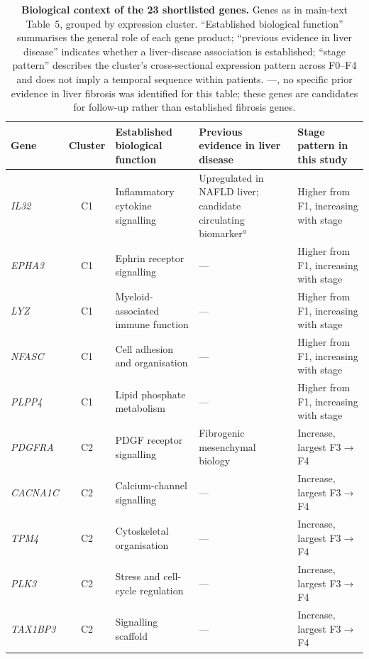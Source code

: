 \documentclass[10pt,a4paper]{article}
\newcommand{\tabsetup}{\sffamily\footnotesize\rowcolors{2}{zebra}{white}\renewcommand{\arraystretch}{1.25}\arrayrulecolor{rule}}
\begin{document}
\begin{table}[p]\centering
\caption{\textbf{Biological context of the 23 shortlisted genes.} Genes as in main-text Table~5, grouped by expression cluster. ``Established biological function'' summarises the general role of each gene product; ``previous evidence in liver disease'' indicates whether a liver-disease association is established; ``stage pattern'' describes the cluster's cross-sectional expression pattern across F0--F4 and does not imply a temporal sequence within patients. ---, no specific prior evidence in liver fibrosis was identified for this table; these genes are candidates for follow-up rather than established fibrosis genes.}
\label{tab:shortlistbio}
{\tabsetup
\begin{tabularx}{\linewidth}{@{}l c >{\raggedright\arraybackslash}X >{\raggedright\arraybackslash}X >{\raggedright\arraybackslash}p{3.6cm}@{}}
\toprule
\rowcolor{white}\textbf{Gene} & \textbf{Cluster} & \textbf{Established biological function} & \textbf{Previous evidence in liver disease} & \textbf{Stage pattern in this study} \\
\midrule
\textit{IL32} & C1 & Inflammatory cytokine signalling & Upregulated in NAFLD liver; candidate circulating biomarker$^{a}$ & Higher from F1, increasing with stage \\
\textit{EPHA3} & C1 & Ephrin receptor signalling & --- & Higher from F1, increasing with stage \\
\textit{LYZ} & C1 & Myeloid-associated immune function & --- & Higher from F1, increasing with stage \\
\textit{NFASC} & C1 & Cell adhesion and organisation & --- & Higher from F1, increasing with stage \\
\textit{PLPP4} & C1 & Lipid phosphate metabolism & --- & Higher from F1, increasing with stage \\
\textit{PDGFRA} & C2 & PDGF receptor signalling & Fibrogenic mesenchymal biology & Increase, largest F3$\rightarrow$F4 \\
\textit{CACNA1C} & C2 & Calcium-channel signalling & --- & Increase, largest F3$\rightarrow$F4 \\
\textit{TPM4} & C2 & Cytoskeletal organisation & --- & Increase, largest F3$\rightarrow$F4 \\
\textit{PLK3} & C2 & Stress and cell-cycle regulation & --- & Increase, largest F3$\rightarrow$F4 \\
\textit{TAX1BP3} & C2 & Signalling scaffold & --- & Increase, largest F3$\rightarrow$F4 \\

\end{tabularx}}
\end{table}
\end{document}
